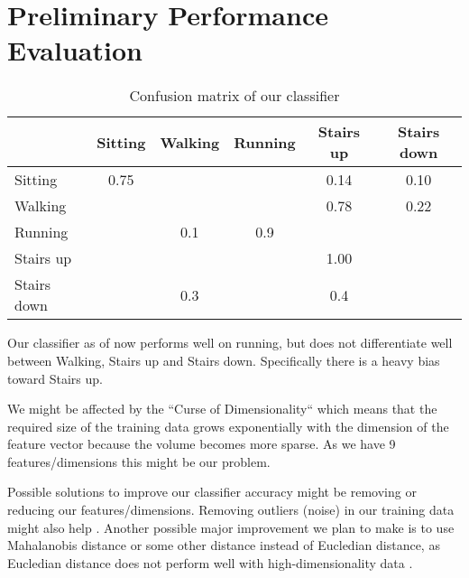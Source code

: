 \section{Preliminary Performance Evaluation}
\label{sec:perf-eval}

\begin{table}[ht]
\centering
\caption{Confusion matrix of our classifier}
\begin{tabular}{lccccc}
\toprule
 & Sitting & Walking & Running & Stairs up & Stairs down\\
\midrule
Sitting & 0.75 &  &  &  0.14 & 0.10\\
Walking &  &  &  & 0.78 & 0.22\\
Running &  & 0.1 & 0.9 &  & \\
Stairs up &  &  &  & 1.00 & \\
Stairs down &  & 0.3 &  & 0.4 & \\
\bottomrule
\end{tabular}
\label{tab:confusion-matrix}
\end{table}


Our classifier as of now performs well on running, but does not differentiate well between Walking, Stairs up and Stairs down. Specifically there is a heavy bias toward Stairs up.

We might be affected by the ``Curse of Dimensionality`` \cite{wikipedia2} which means that the required size of the training data grows exponentially with the dimension of the feature vector because the volume becomes more sparse. As we have 9 features/dimensions this might be our problem.

Possible solutions to improve our classifier accuracy might be removing or reducing our features/dimensions. Removing outliers (noise) in our training data might also help \cite{wikipedia1}.
Another possible major improvement we plan to make is to use Mahalanobis distance or some other distance instead of Eucledian distance, as Eucledian distance does not perform well with high-dimensionality data \cite{wikipedia1}.